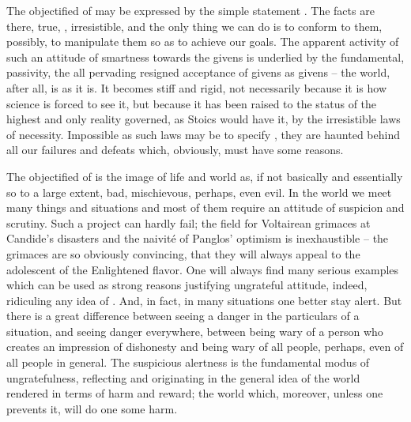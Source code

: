 The {objectified}  of 
may be expressed by the simple statement .  The facts
are there, true, 
, irresistible, and the only thing we can do is to conform to
them, possibly, to manipulate them so as to achieve our goals.  The apparent
activity of such an attitude of smartness towards the givens is underlied by the
fundamental,  passivity, the all pervading resigned acceptance of
givens as givens -- the world, after all, is as it is.  It becomes stiff and
rigid, not necessarily because it is how science is forced to see it, but
because it has been raised to the status of the highest and only reality
governed, as Stoics would have it, by the irresistible laws of
necessity. Impossible as such laws may be to specify , they are
haunted behind all our failures and defeats which, obviously, must have some
 reasons. 

The {objectified}  of 
is the image of life and world as, if not basically and essentially so to a
large extent, bad, mischievous, perhaps, even evil.  In the world we 
meet many things and situations and most of them require an attitude of
suspicion and scrutiny.  Such a project can hardly fail; the field for
Voltairean grimaces at Candide's disasters and the naivit\'{e} of Panglos'
optimism is inexhaustible -- the grimaces are so obviously convincing, that they
will always appeal to the adolescent  of the Enlightened flavor.
One will always find many serious examples which can be used as strong reasons
justifying ungrateful attitude, indeed, ridiculing any idea of
.  And, in fact, in many situations one better stay alert. But
there is a great difference between seeing a danger in the particulars of a
situation, and seeing danger everywhere, between being wary of a person who
creates an impression of dishonesty and being wary of all people, perhaps, even
of all people in general.  The suspicious alertness is the fundamental modus of
ungratefulness, reflecting and originating in the general idea of the world
rendered in terms of harm and reward; the world which, moreover, unless one
prevents it, will do one some harm. 


